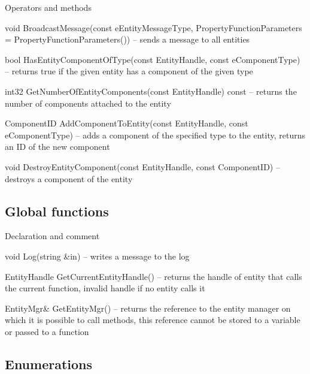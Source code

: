 \documentclass[12pt, a4paper]{article}
\newenvironment{titled-itemize}[1]
{
\vspace{5mm}
\noindent\textbf{#1}
\begin{itemize}
}
{
\end{itemize}
}
\begin{document}
\begin{titled-itemize}{Operators and methods}
  \item void BroadcastMessage(const eEntityMessageType, PropertyFunctionParameters = PropertyFunctionParameters()) -- sends a message to all entities
  \item bool HasEntityComponentOfType(const EntityHandle, const eComponentType) -- returns true if the given entity has a component of the given type
  \item int32 GetNumberOfEntityComponents(const EntityHandle) const -- returns the number of components attached to the entity
  \item ComponentID AddComponentToEntity(const EntityHandle, const e\-Com\-po\-nent\-Ty\-pe) -- adds a component of the specified type to the entity, returns an ID of the new component
  \item void DestroyEntityComponent(const EntityHandle, const Com\-po\-nent\-ID) -- destroys a component of the entity
\end{titled-itemize}

\subsection{Global functions}

\begin{titled-itemize}{Declaration and comment}
  \item void Log(string \&in) -- writes a message to the log
  \item EntityHandle GetCurrentEntityHandle() -- returns the handle of entity that calls the current function, invalid handle if no entity calls it
  \item EntityMgr\& GetEntityMgr() -- returns the reference to the entity manager on which it is possible to call methods, this reference cannot be stored to a variable or passed to a function
\end{titled-itemize}

\subsection{Enumerations}
\end{document}
